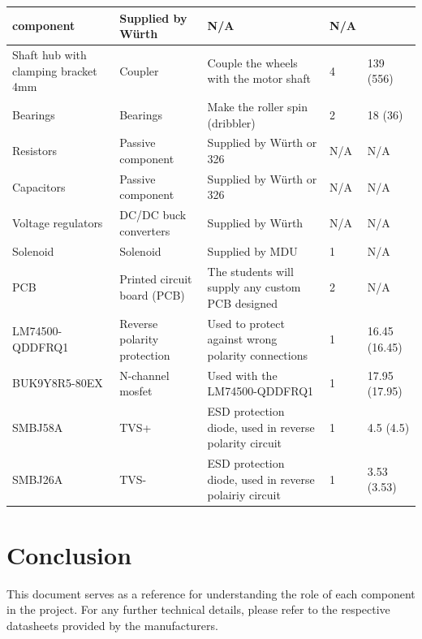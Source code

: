 \documentclass[a4paper,4pt]{article}
\begin{document}
\begin{longtable}{|p{3cm}|p{3cm}|p{3cm}|p{1cm}|p{2cm}| }
    component & Supplied by Würth & N/A & N/A \\ \hline Shaft hub with
    clamping bracket 4mm & Coupler & Couple the wheels with the motor
    shaft & 4 & 139 (556) \\ \hline Bearings & Bearings & Make the
    roller spin (dribbler) & 2 & 18 (36)\\ \hline Resistors & Passive
    component & Supplied by Würth or 326 & N/A & N/A \\ \hline
    Capacitors & Passive component & Supplied by Würth or 326 & N/A &
    N/A \\ \hline Voltage regulators & DC/DC buck converters & Supplied
    by Würth & N/A & N/A \\ \hline Solenoid & Solenoid & Supplied by MDU
    & 1 & N/A \\ \hline PCB & Printed circuit board (PCB) & The students
    will supply any custom PCB designed & 2 & N/A\\ \hline
    LM74500\break-QDDFRQ1 & Reverse polarity protection & Used to
    protect against wrong polarity connections & 1 & 16.45 (16.45) \\
    \hline BUK9Y8R5-80EX & N-channel mosfet & Used with the
    LM74500\break-QDDFRQ1 & 1 & 17.95 (17.95) \\ \hline SMBJ58A & TVS+ &
    ESD protection diode, used in reverse polarity circuit & 1 & 4.5
    (4.5) \\ \hline SMBJ26A & TVS- & ESD protection diode, used in
    reverse polairiy circuit & 1 & 3.53 (3.53) \\ \hline

  \end{longtable}

  \section*{Conclusion}

  This document serves as a reference for understanding the role of each
  component in the project. For any further technical details, please
  refer to the respective datasheets provided by the manufacturers.

   
\end{document}
